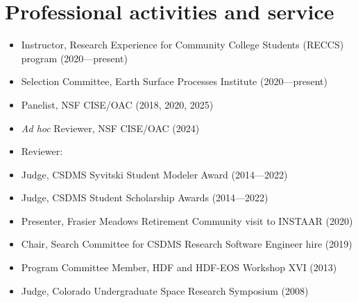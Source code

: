 \section{Professional activities and service}
\vspace{0.5em}

\begin{itemize}

  \item Instructor, Research Experience for Community College Students (RECCS) program (2020---present)

  \item Selection Committee, Earth Surface Processes Institute (2020---present)

  \item Panelist, NSF CISE/OAC (2018, 2020, 2025)

  \item \textit{Ad hoc} Reviewer, NSF CISE/OAC (2024)

  \item Reviewer:

  \item Judge, CSDMS Syvitski Student Modeler Award (2014---2022)

  \item Judge, CSDMS Student Scholarship Awards (2014---2022)

  \item Presenter, Frasier Meadows Retirement Community visit to INSTAAR (2020)

  \item Chair, Search Committee for CSDMS Research Software Engineer hire (2019)

  \item Program Committee Member, HDF and HDF-EOS Workshop XVI (2013)

  \item Judge, Colorado Undergraduate Space Research Symposium (2008)

\end{itemize}
